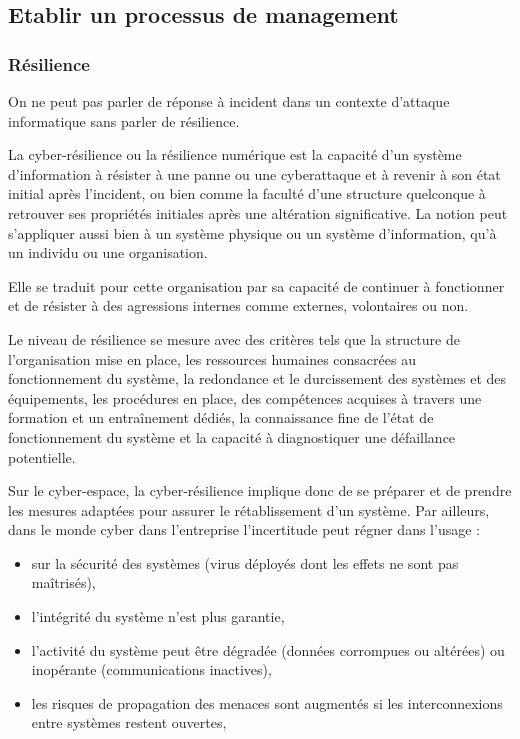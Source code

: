 \subsection{Etablir un processus de management} 



\subsubsection{Résilience}
 
 On ne peut pas parler de réponse à incident dans un contexte d'attaque informatique sans parler de résilience.
 
La cyber-résilience ou la résilience numérique est la capacité d’un système d’information à résister à une panne ou une cyberattaque et à revenir à son état initial après l’incident, ou bien comme la faculté d’une structure quelconque à retrouver ses propriétés initiales après une altération significative. La notion peut s’appliquer aussi bien à un système physique ou un système d'information, qu’à un individu ou une organisation. 

Elle se traduit pour cette organisation par sa capacité de continuer à fonctionner et de résister à des agressions internes comme externes, volontaires ou non.

 Le niveau de résilience se mesure  avec des critères tels que la structure de l’organisation mise en place, les ressources humaines consacrées au fonctionnement du système, la redondance et le durcissement des systèmes et des équipements, les procédures en place, des compétences acquises à travers une formation et un entraînement dédiés, la connaissance fine de l’état de fonctionnement du système et la capacité à diagnostiquer une défaillance potentielle.
 
Sur le cyber-espace, la cyber-résilience implique donc de se préparer et de prendre  les mesures adaptées pour assurer le rétablissement d’un système. Par  ailleurs, dans le monde cyber dans l'entreprise l’incertitude peut régner dans l'usage :
\begin{itemize}
  \item  sur la sécurité des systèmes (virus déployés dont les effets ne sont pas maîtrisés), 
   \item l’intégrité du système n’est plus garantie, 
  \item l’activité du système peut être dégradée (données corrompues ou altérées) ou inopérante (communications inactives), 
  \item les risques de propagation des menaces sont augmentés si les interconnexions entre systèmes restent ouvertes, 
    
\end{itemize}

